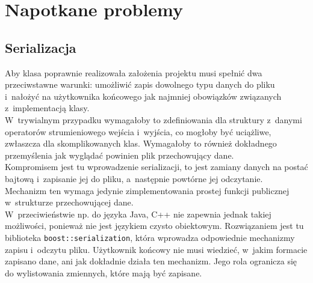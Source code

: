 \documentclass[a4paper]{article}
\begin{document}
\section{Napotkane problemy}
\subsection{Serializacja}
Aby klasa poprawnie realizowała założenia projektu musi spełnić dwa przeciwstawne warunki: umożliwić zapis dowolnego typu danych do pliku i~nałożyć na użytkownika końcowego jak najmniej obowiązków związanych z~implementacją klasy.\\
W~trywialnym przypadku wymagałoby to zdefiniowania dla struktury z~danymi operatorów strumieniowego wejścia i~wyjścia, co mogłoby być uciążliwe, zwłaszcza dla skomplikowanych klas.
Wymagałoby to również dokładnego przemyślenia jak wyglądać powinien plik przechowujący dane.\\
Kompromisem jest tu wprowadzenie serializacji, to jest zamiany danych na postać bajtową i~zapisanie jej do pliku, a~następnie powtórne jej odczytanie.\\
Mechanizm ten wymaga jedynie zimplementowania prostej funkcji publicznej w~strukturze przechowującej dane.\\
W~przeciwieństwie np. do języka Java, C++ nie zapewnia jednak takiej możliwości, ponieważ nie jest językiem czysto obiektowym.
Rozwiązaniem jest tu biblioteka \texttt{boost::serialization}, która wprowadza odpowiednie mechanizmy zapisu i~odczytu pliku.
Użytkownik końcowy nie musi wiedzieć, w~jakim formacie zapisano dane, ani jak dokładnie działa ten mechanizm. 
Jego rola ogranicza się do wylistowania zmiennych, które mają być zapisane. 
\end{document}
